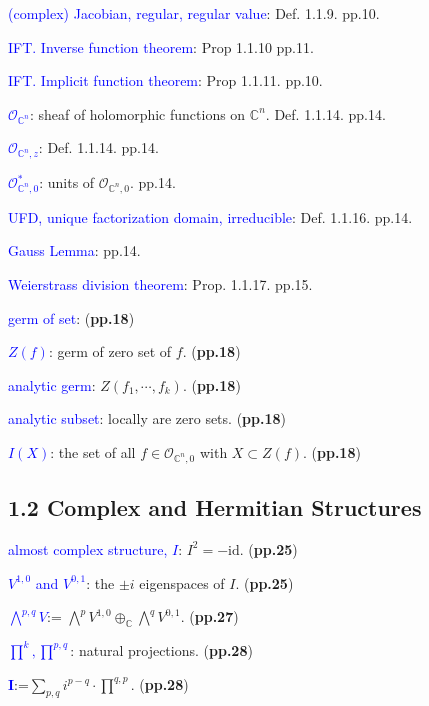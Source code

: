     \textcolor{blue}{(complex) Jacobian, regular, regular value}: Def. 1.1.9. pp.10.
    
    \textcolor{blue}{IFT. Inverse function theorem}: Prop 1.1.10 pp.11.
    
    \textcolor{blue}{IFT. Implicit function theorem}: Prop 1.1.11. pp.10.
    
    \textcolor{blue}{$\mathcal{O}_{\mathbb{C}^n}$}:
    sheaf of holomorphic functions on $\mathbb{C}^n$. Def. 1.1.14. pp.14.
    
    \textcolor{blue}{$\mathcal{O}_{\mathbb{C}^n,z}$}: Def. 1.1.14. pp.14.
    
    \textcolor{blue}{$\mathcal{O}^*_{\mathbb{C}^n,0}$}:
    units of $\mathcal{O}_{\mathbb{C}^n,0}$. pp.14.
    
    \textcolor{blue}{UFD, unique factorization domain, irreducible}: 
    Def. 1.1.16. pp.14.
    
    \textcolor{blue}{Gauss Lemma}: pp.14.
    
    \textcolor{blue}{Weierstrass division theorem}: Prop. 1.1.17. pp.15.
    
    \textcolor{blue}{germ of set}: (\textbf{pp.18})

    \textcolor{blue}{$Z(f)$}: germ of zero set of $f$. (\textbf{pp.18})

    \textcolor{blue}{analytic germ}: $Z(f_1,\cdots,f_k)$. (\textbf{pp.18})

    \textcolor{blue}{analytic subset}: locally are zero sets. (\textbf{pp.18})

    \textcolor{blue}{$I(X)$}: the set of all $f\in
    \mathcal{O}_{\mathbb{C}^n,0}$ with $X\subset Z(f)$. (\textbf{pp.18})
    \subsection{1.2 Complex and Hermitian Structures}
    \textcolor{blue}{almost complex structure, $I$}: $I^2=-\text{id}$.
    (\textbf{pp.25})

    \textcolor{blue}{$V^{1,0}$ and $V^{0,1}$}: the $\pm i$ eigenspaces 
    of $I$.
    (\textbf{pp.25})

    \textcolor{blue}{$\bigwedge^{p,q} V$}:=
    $\bigwedge^p V^{1,0}\oplus_{\mathbb{C}}\bigwedge^q V^{0,1}$.
    (\textbf{pp.27})

    \textcolor{blue}{$\prod^k,\prod^{p,q}$}: natural projections.
    (\textbf{pp.28})
    
    \textcolor{blue}{$\mathbf{I}$}:=$\sum_{p,q}i^{p-q}\cdot\prod^{q,p}$.
    (\textbf{pp.28})

